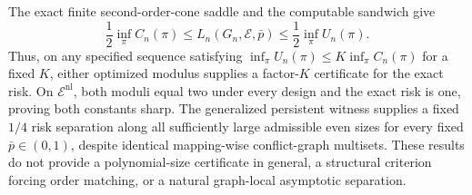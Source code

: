 The exact finite second-order-cone saddle and the computable sandwich give
\[
 \frac12\inf_\pi C_n(\pi)
 \le L_n(G_n,\mathcal E,\bar p)
 \le\frac12\inf_\pi U_n(\pi).
\]
Thus, on any specified sequence satisfying \(\inf_\pi U_n(\pi)\le K\inf_\pi C_n(\pi)\) for a fixed \(K\), either optimized modulus supplies a factor-\(K\) certificate for the exact risk.  On \(\mathcal E^{\mathrm{nl}}\), both moduli equal two under every design and the exact risk is one, proving both constants sharp.  The generalized persistent witness supplies a fixed \(1/4\) risk separation along all sufficiently large admissible even sizes for every fixed \(\bar p\in(0,1)\), despite identical mapping-wise conflict-graph multisets.  These results do not provide a polynomial-size certificate in general, a structural criterion forcing order matching, or a natural graph-local asymptotic separation.